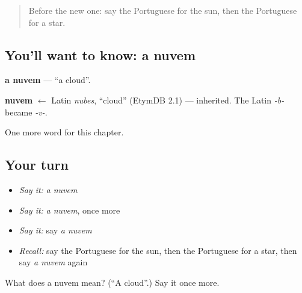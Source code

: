 \begin{quote}
Before the new one: say the Portuguese for the sun, then the Portuguese for a star.
\end{quote}

\subsection*{You'll want to know: a nuvem}
\textbf{a nuvem} — \textquotedblleft{}a cloud\textquotedblright{}.

\begin{cousinweb}
\textbf{nuvem} $\leftarrow$ Latin \emph{nubes}, \textquotedblleft{}cloud\textquotedblright{} (EtymDB 2.1) — inherited. The Latin \emph{-b-} became \emph{-v-}.
\end{cousinweb}

\begin{grammarlens}[title={What you've built}]
One more word for this chapter.
\end{grammarlens}

\subsection*{Your turn}
\begin{itemize}
\raggedright
  \item \emph{Say it:} \emph{a nuvem}
  \item \emph{Say it:} \emph{a nuvem}, once more
  \item \emph{Say it:} say \emph{a nuvem}
  \item \emph{Recall:} say the Portuguese for the sun, then the Portuguese for a star, then say \emph{a nuvem} again
\end{itemize}

\begin{tcolorbox}[breakable,colback=teal!4,colframe=teal!35!black,title={Before you move on}]
What does a nuvem mean? (\textquotedblleft{}A cloud\textquotedblright{}.) Say it once more.
\end{tcolorbox}

